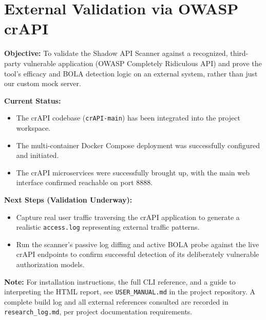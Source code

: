 \documentclass[11pt]{article}
\newcommand{\sublabel}[1]{\textcolor{accent}{\textbf{#1}}}
\begin{document}
\section{External Validation via OWASP crAPI}

\sublabel{Objective:} To validate the Shadow API Scanner against a recognized, third-party vulnerable application (OWASP Completely Ridiculous API) and prove the tool's efficacy and BOLA detection logic on an external system, rather than just our custom mock server.

\sublabel{Current Status:}
\begin{itemize}
    \item The crAPI codebase (\texttt{crAPI-main}) has been integrated into the project workspace.
    \item The multi-container Docker Compose deployment was successfully configured and initiated.
    \item The crAPI microservices were successfully brought up, with the main web interface confirmed reachable on port 8888.
\end{itemize}

\sublabel{Next Steps (Validation Underway):}
\begin{itemize}
    \item Capture real user traffic traversing the crAPI application to generate a realistic \texttt{access.log} representing external traffic patterns.
    \item Run the scanner's passive log diffing and active BOLA probe against the live crAPI endpoints to confirm successful detection of its deliberately vulnerable authorization models.
\end{itemize}

\vspace{2em}
\noindent \sublabel{Note:} For installation instructions, the full CLI reference, and a guide to interpreting the HTML report, see \texttt{USER\_MANUAL.md} in the project repository. A complete build log and all external references consulted are recorded in \texttt{research\_log.md}, per project documentation requirements.
\end{document}
